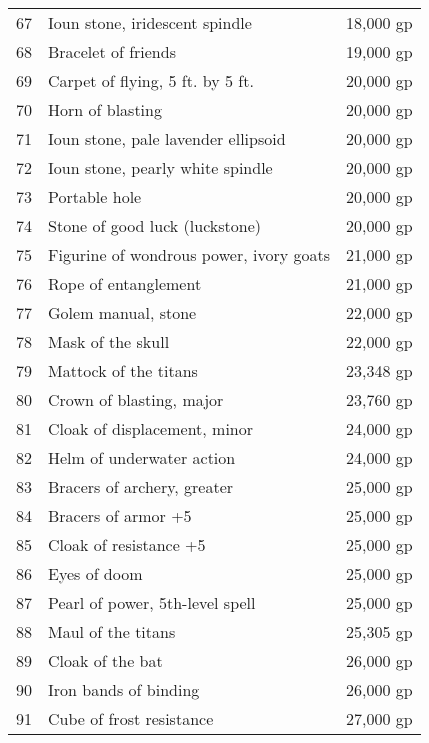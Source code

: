 \begin{xtabular}{lll}
67  & Ioun stone, iridescent spindle              & 18,000 gp    \\
68  & Bracelet of friends                         & 19,000 gp    \\
69  & Carpet of flying, 5 ft. by 5 ft.            & 20,000 gp    \\
70  & Horn of blasting                            & 20,000 gp    \\
71  & Ioun stone, pale lavender ellipsoid         & 20,000 gp    \\
72  & Ioun stone, pearly white spindle            & 20,000 gp    \\
73  & Portable hole                               & 20,000 gp    \\
74  & Stone of good luck (luckstone)              & 20,000 gp    \\
75  & Figurine of wondrous power, ivory goats     & 21,000 gp    \\
76  & Rope of entanglement                        & 21,000 gp    \\
77  & Golem manual, stone                         & 22,000 gp    \\
78  & Mask of the skull                           & 22,000 gp    \\
79  & Mattock of the titans                       & 23,348 gp    \\
80  & Crown of blasting, major                    & 23,760 gp    \\
81  & Cloak of displacement, minor                & 24,000 gp    \\
82  & Helm of underwater action                   & 24,000 gp    \\
83  & Bracers of archery, greater                 & 25,000 gp    \\
84  & Bracers of armor +5                         & 25,000 gp    \\
85  & Cloak of resistance +5                      & 25,000 gp    \\
86  & Eyes of doom                                & 25,000 gp    \\
87  & Pearl of power, 5th-level spell             & 25,000 gp    \\
88  & Maul of the titans                          & 25,305 gp    \\
89  & Cloak of the bat                            & 26,000 gp    \\
90  & Iron bands of binding                       & 26,000 gp    \\
91  & Cube of frost resistance                    & 27,000 gp    \\

\end{xtabular}
